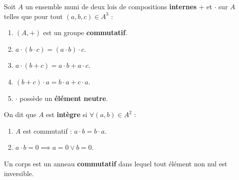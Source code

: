 \begin{definition}
	Soit $A$ un ensemble muni de deux lois de compositions \textbf{internes} \og $+$ \fg et \og $\cdot$ \fg sur $A$ telles que pour tout $(a, b, c) \in A^3$ : 
	\begin{enumerate}
			\item $(A, +)$ est un groupe \textbf{commutatif}.
			\item $a \cdot (b \cdot c) = (a \cdot b) \cdot c$.
			\item $a \cdot (b + c) = a \cdot b + a \cdot c$.
			\item $(b + c) \cdot a = b \cdot a + c \cdot a$.
			\item \og $\cdot$ \fg possède un \textbf{élément neutre}.
		\end{enumerate}
	\noindent On dit que $A$ est \textbf{intègre} si $\forall (a, b) \in A^2$ :
	\begin{enumerate}
			\item $A$ est commutatif : $a \cdot b = b \cdot a$.
			\item $a \cdot b = 0 \implies a = 0 \lor b = 0$.
		\end{enumerate}
\end{definition}

\begin{definition}
    Un corps est un anneau \textbf{commutatif} dans lequel tout élément non nul est inversible.
\end{definition}

